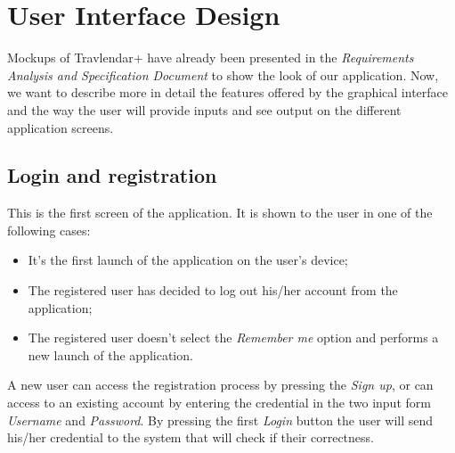 \documentclass[12pt,titlepage]{article}
\begin{document}
\section{User Interface Design}
Mockups of Travlendar+ have already been presented in the \textit{Requirements Analysis and Specification Document} to show the look of our application. Now, we want to describe more in detail the features offered by the graphical interface and the way the user will provide inputs and see output on the different application screens.
\clearpage
\newpage

\subsection{Login and registration}\label{sec:Login}
This is the first screen of the application. It is shown to the user in one of the following cases:
\begin{itemize}
\item It's the first launch of the application on the user's device;
\item The registered user has decided to log out his/her account from the application;
\item The registered user doesn't select the \textit{Remember me} option and performs a new launch of the application.
\end{itemize}
A new user can access the registration process by pressing the \textit{Sign up}, or can access to an existing account by entering the credential in the two input form \textit{Username} and \textit{Password}. By pressing the first \textit{Login} button the user will send his/her credential to the system that will check if their correctness.
\end{document}
